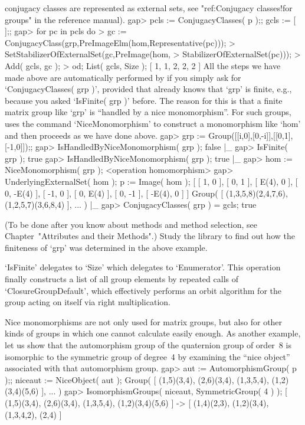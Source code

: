 conjugacy  classes are represented as   external sets, see "ref:Conjugacy
classes!for groups" in the reference manual).
\beginexample
    gap> pcls := ConjugacyClasses( p );; gcls := [  ];;
    gap> for pc  in pcls  do
    >      gc := ConjugacyClass(grp,PreImageElm(hom,Representative(pc)));
    >      SetStabilizerOfExternalSet(gc,PreImage(hom,
    >                                 StabilizerOfExternalSet(pc)));
    >      Add( gcls, gc );
    >    od; List( gcls, Size );
    [ 1, 1, 2, 2, 2 ]
\endexample
All the steps we have made above are automatically performed by {\GAP} if
you  simply ask for `ConjugacyClasses(   grp   )', provided that   {\GAP}
already knows  that `grp' is finite, e.g.,  because  you asked `IsFinite(
grp  )' before. The reason  for this is that  a  finite matrix group like
`grp' is ``handled by a nice monomorphism''. For such groups, {\GAP} uses
the command `NiceMonomorphism' to construct a monomorphism like `hom' and
then proceeds as we have done above.
\beginexample
    gap> grp := Group([[i,0],[0,-i]],[[0,1],[-1,0]]);;
    gap> IsHandledByNiceMonomorphism( grp );
    false
|_
    gap> IsFinite( grp );
    true
    gap> IsHandledByNiceMonomorphism( grp );
    true
|_
    gap> hom := NiceMonomorphism( grp );
    <operation homomorphism>
    gap> UnderlyingExternalSet( hom ); p := Image( hom );
    [ [ 1, 0 ], [ 0, 1 ], [ E(4), 0 ], [ 0, -E(4) ], [ -1, 0 ],
      [ 0, E(4) ], [ 0, -1 ], [ -E(4), 0 ] ]
    Group( [ (1,3,5,8)(2,4,7,6), (1,2,5,7)(3,6,8,4) ], ... )
|_
    gap> ConjugacyClasses( grp ) = gcls;
    true
\endexample

\exercise (To be done after you know  about methods and method selection,
see Chapter~"Attributes and their Methods".)  Study the {\GAP} library to
find out how the finiteness of `grp' was determined in the above example.

\answer `IsFinite' delegates to  `Size' which delegates  to `Enumerator'.
This  operation finally constructs    a list of  all  group   elements by
repeated calls of   `ClosureGroupDefault', which effectively performs  an
orbit algorithm for the group acting on itself via right multiplication.

Nice monomorphisms are  not  only used  for matrix groups,  but  also for
other kinds  of groups in  which one cannot   calculate easily enough. As
another  example,   let us   show that  the    automorphism group of  the
quaternion group  of  order~8 is isomorphic  to  the  symmetric  group of
degree~4   by examining    the  ``nice   object'' associated  with   that
automorphism group.
\beginexample
    gap> aut := AutomorphismGroup( p );; niceaut := NiceObject( aut );
    Group( [ (1,5)(3,4), (2,6)(3,4), (1,3,5,4), (1,2)(3,4)(5,6) ], ... )
    gap> IsomorphismGroups( niceaut, SymmetricGroup( 4 ) );
    [ (1,5)(3,4), (2,6)(3,4), (1,3,5,4), (1,2)(3,4)(5,6) ] -> 
    [ (1,4)(2,3), (1,2)(3,4), (1,3,4,2), (2,4) ]
\endexample

